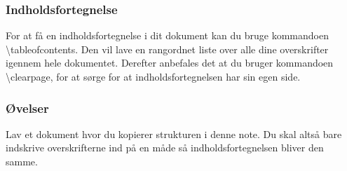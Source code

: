 \subsubsection{Indholdsfortegnelse}
For at få en indholdsfortegnelse i dit dokument kan du bruge kommandoen \textbackslash tableofcontents.
Den vil lave en rangordnet liste over alle dine overskrifter igennem hele dokumentet.
Derefter anbefales det at du bruger kommandoen \textbackslash clearpage, for at sørge for at indholdsfortegnelsen har sin egen side.

\subsubsection{Øvelser}
\begin{opg}
Lav et dokument hvor du kopierer strukturen i denne note.
Du skal altså bare indskrive overskrifterne ind på en måde så indholdsfortegnelsen bliver den samme.
\end{opg}
